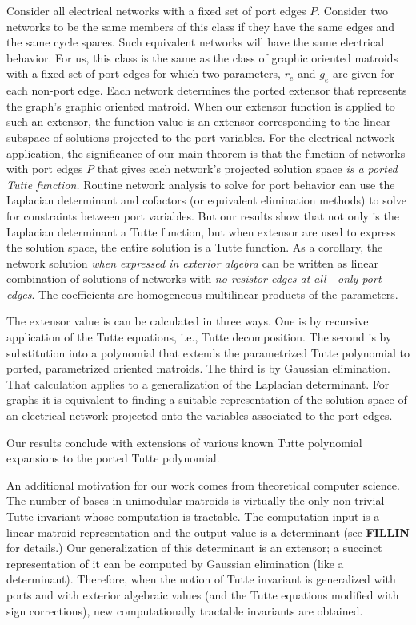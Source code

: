 \documentclass[12pt]{article}
\theoremstyle{definition}
\begin{document}
Consider all electrical networks with a fixed set of port edges $P$.
Consider two networks to be the same members of this class 
if they have the same edges and the
same cycle spaces.  Such equivalent networks will have the same
electrical behavior.
For us, this class is the same as the class of graphic oriented 
matroids with a fixed set of port edges for which two parameters, $r_e$ and
$g_e$ are given for each non-port edge.  Each network determines
the ported extensor that represents the graph's graphic oriented matroid.
When our extensor function is applied to such an extensor, the
function value is an extensor corresponding to the linear
subspace of solutions projected to the port variables.
For the electrical network application,
the significance of our main theorem 
is that the function of networks with port edges $P$
that gives each network's projected solution space
\textit{is a ported Tutte function.}  Routine network analysis
to solve for port behavior can use the Laplacian determinant and cofactors 
(or equivalent elimination methods) to solve for constraints between 
port variables.
But our results show that not only is
the Laplacian determinant a Tutte function, but when extensor
are used to express the solution space, the entire solution
is a Tutte function.
As a corollary, the network solution \emph{when expressed in exterior
algebra} can be written as linear combination of solutions of networks
with \emph{no resistor edges at all---only port edges}.  The coefficients
are homogeneous multilinear products of the parameters.

The extensor value is can be calculated in three ways.  
One is by recursive application of the Tutte equations, i.e., 
Tutte decomposition.  The second is
by substitution into a polynomial that extends the parametrized
Tutte polynomial to ported, parametrized oriented matroids.  
The third is by Gaussian elimination.  
That calculation applies to a generalization of the Laplacian
determinant.  For graphs it is equivalent to finding a suitable
representation of the solution space of an electrical network
projected onto the variables associated to the port edges.

Our results conclude  with extensions of various known 
Tutte polynomial expansions to the ported Tutte polynomial.

An additional motivation for our work comes from theoretical computer
science.  The number of bases in unimodular matroids is virtually the
only non-trivial Tutte invariant whose computation is tractable.
The computation input is a linear matroid representation 
and the output value is a determinant (see \textbf{FILLIN}
for details.)
Our generalization of this determinant is an extensor; a succinct
representation of it can be computed by Gaussian elimination (like
a determinant).  Therefore, when the notion of Tutte invariant is
generalized with ports and with exterior algebraic values (and the 
Tutte equations modified with sign corrections), new computationally 
tractable invariants are obtained.
\end{document}
